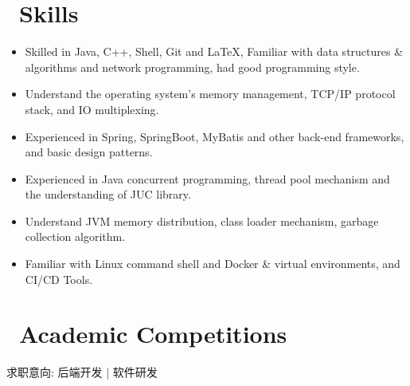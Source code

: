 \documentclass{resume}
\begin{document}
\section{\faCogs\ Skills}
\begin{itemize}[parsep=0.5ex]
  \item Skilled in Java, C++, Shell, Git and \LaTeX, Familiar with data structures \& algorithms and network programming, had good programming style.
  \item Understand the operating system's memory management, TCP/IP protocol stack, and IO multiplexing.
  \item Experienced in Spring, SpringBoot, MyBatis and other back-end frameworks, and basic design patterns.
  \item Experienced in Java concurrent programming, thread pool mechanism and the understanding of JUC library.
  \item Understand JVM memory distribution, class loader mechanism, garbage collection algorithm.
  \item Familiar with Linux command shell and Docker \& virtual environments, and CI/CD Tools.
\end{itemize}

\section{\faTrophy\ Academic Competitions}


\clearpage

\centerline{求职意向: 后端开发 | 软件研发}
\vspace{1ex}



\vspace{-1ex}
 
\end{document}
